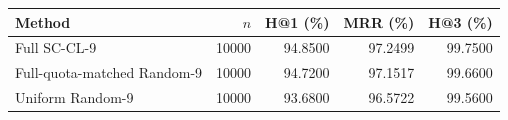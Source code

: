 \begin{tabular}{lrrrr}
\toprule
Method & $n$ & H@1 (\%) & MRR (\%) & H@3 (\%) \\
\midrule
Full SC-CL-9 & 10000 & 94.8500 & 97.2499 & 99.7500 \\
Full-quota-matched Random-9 & 10000 & 94.7200 & 97.1517 & 99.6600 \\
Uniform Random-9 & 10000 & 93.6800 & 96.5722 & 99.5600 \\
\bottomrule
\end{tabular}
